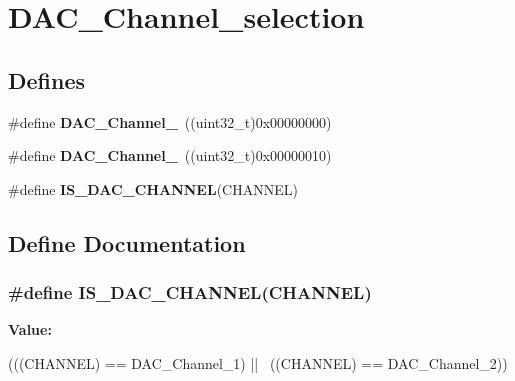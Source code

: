 \hypertarget{group__DAC__Channel__selection}{
\section{DAC\_\-Channel\_\-selection}
\label{group__DAC__Channel__selection}
}
\subsection*{Defines}
\begin{DoxyCompactItemize}
\item 
\hypertarget{group__DAC__Channel__selection_gacf6585474ed2a302b69a3725daa91555}{
\#define {\bfseries DAC\_\-Channel\_}~((uint32\_\-t)0x00000000)}
\label{group__DAC__Channel__selection_gacf6585474ed2a302b69a3725daa91555}

\item 
\hypertarget{group__DAC__Channel__selection_ga0e9b0096866bb06e8a82b3e4e66943bb}{
\#define {\bfseries DAC\_\-Channel\_}~((uint32\_\-t)0x00000010)}
\label{group__DAC__Channel__selection_ga0e9b0096866bb06e8a82b3e4e66943bb}

\item 
\#define {\bfseries IS\_\-DAC\_\-CHANNEL}(CHANNEL)
\end{DoxyCompactItemize}


\subsection{Define Documentation}
\hypertarget{group__DAC__Channel__selection_gafb2b9bdaccb3a5e3396925d7cba02cc3}{
\subsubsection[{IS\_\-DAC\_\-CHANNEL}]{\setlength{\rightskip}{0pt plus 5cm}\#define IS\_\-DAC\_\-CHANNEL(CHANNEL)}}
\label{group__DAC__Channel__selection_gafb2b9bdaccb3a5e3396925d7cba02cc3}
{\bfseries Value:}
\begin{DoxyCode}
(((CHANNEL) == DAC_Channel_1) || \
                                 ((CHANNEL) == DAC_Channel_2))
\end{DoxyCode}

